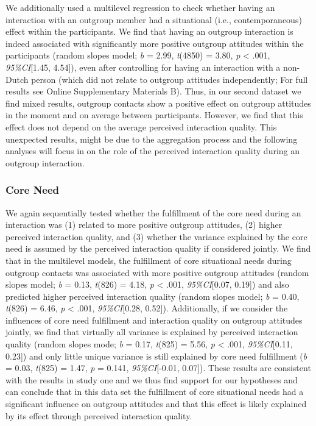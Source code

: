 \documentclass[man, 12pt, a4paper]{apa7}
\theoremstyle{break}
\theoremstyle{plain}
\begin{document}
We additionally used a multilevel regression to check whether having an
interaction with an outgroup member had a situational (i.e.,
contemporaneous) effect within the participants. We find that having an
outgroup interaction is indeed associated with significantly more
positive outgroup attitudes within the participants (random slopes
model; \textit{b} = 2.99, \textit{t}(4850) = 3.80, \textit{p}
\textless{} .001, \textit{95\%CI}{[}1.45, 4.54{]}), even after
controlling for having an interaction with a non-Dutch person (which did
not relate to outgroup attitudes independently; For full results see
Online Supplementary Materials B). Thus, in our second dataset we find
mixed results, outgroup contacts show a positive effect on outgroup
attitudes in the moment and on average between participants. However, we
find that this effect does not depend on the average perceived
interaction quality. This unexpected results, might be due to the
aggregation process and the following analyses will focus in on the role
of the perceived interaction quality during an outgroup interaction.

\subsubsection{Core Need}

We again sequentially tested whether the fulfillment of the core need
during an interaction was (1) related to more positive outgroup
attitudes, (2) higher perceived interaction quality, and (3) whether the
variance explained by the core need is assumed by the perceived
interaction quality if considered jointly. We find that in the
multilevel models, the fulfillment of core situational needs during
outgroup contacts was associated with more positive outgroup attitudes
(random slopes model; \textit{b} = 0.13, \textit{t}(826) = 4.18,
\textit{p} \textless{} .001, \textit{95\%CI}{[}0.07, 0.19{]}) and also
predicted higher perceived interaction quality (random slopes model;
\textit{b} = 0.40, \textit{t}(826) = 6.46, \textit{p} \textless{} .001,
\textit{95\%CI}{[}0.28, 0.52{]}). Additionally, if we consider the
influences of core need fulfillment and interaction quality on outgroup
attitudes jointly, we find that virtually all variance is explained by
perceived interaction quality (random slopes mode; \textit{b} = 0.17,
\textit{t}(825) = 5.56, \textit{p} \textless{} .001,
\textit{95\%CI}{[}0.11, 0.23{]}) and only little unique variance is
still explained by core need fulfillment (\textit{b} = 0.03,
\textit{t}(825) = 1.47, \textit{p} = 0.141, \textit{95\%CI}{[}-0.01,
0.07{]}). These results are consistent with the results in study one and
we thus find support for our hypotheses and can conclude that in this
data set the fulfillment of core situational needs had a significant
influence on outgroup attitudes and that this effect is likely explained
by its effect through perceived interaction quality.
\end{document}
